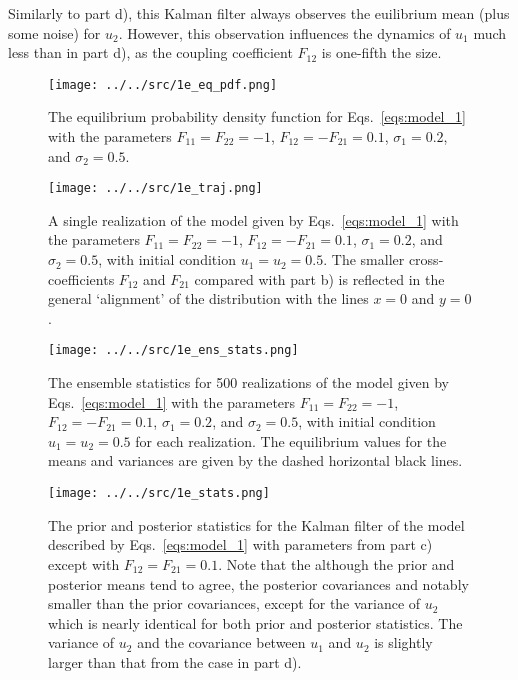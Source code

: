 \begin{enumerate}[a)]
	Similarly to part d), this Kalman filter always observes the euilibrium mean (plus some noise) for $u_2$. However, this observation influences the dynamics of $u_1$ much less than in part d), as the coupling coefficient $F_{12}$ is one-fifth the size.
	
	\begin{figure}[H]
		\centering
		\texttt{[image: ../../src/1e\_eq\_pdf.png]}
		\caption{The equilibrium probability density function for Eqs.~\ref{eqs:model_1} with the parameters $F_{11} = F_{22} = -1$, $F_{12} = -F_{21} = 0.1$, $\sigma_1 = 0.2$, and $\sigma_2 = 0.5$.}
		\label{fig:1e_eq_pdf}
	\end{figure}
	
	\begin{figure}[H]
		\centering
		\texttt{[image: ../../src/1e\_traj.png]}
		\caption{A single realization of the model given by Eqs.~\ref{eqs:model_1} with the parameters $F_{11} = F_{22} = -1$, $F_{12} = -F_{21} = 0.1$, $\sigma_1 = 0.2$, and $\sigma_2 = 0.5$, with initial condition $u_1 = u_2 = 0.5$. The smaller cross-coefficients $F_{12}$ and $F_{21}$ compared with part b) is reflected in the general `alignment' of the distribution with the lines $x = 0$ and $y = 0$.}
		\label{fig:1e_traj}
	\end{figure}
	
	\begin{figure}[H]
		\centering
		\texttt{[image: ../../src/1e\_ens\_stats.png]}
		\caption{The ensemble statistics for 500 realizations of the model given by Eqs.~\ref{eqs:model_1} with the parameters $F_{11} = F_{22} = -1$, $F_{12} = -F_{21} = 0.1$, $\sigma_1 = 0.2$, and $\sigma_2 = 0.5$, with initial condition $u_1 = u_2 = 0.5$ for each realization. The equilibrium values for the means and variances are given by the dashed horizontal black lines.}
		\label{fig:1e_ens_stats}
	\end{figure}
	
	\begin{figure}[H]
		\centering
		\texttt{[image: ../../src/1e\_stats.png]}
		\caption{The prior and posterior statistics for the Kalman filter of the model described by Eqs.~\ref{eqs:model_1} with parameters from part c) except with $F_{12} = F_{21} = 0.1$. Note that the although the prior and posterior means tend to agree, the posterior covariances and notably smaller than the prior covariances, except for the variance of $u_2$ which is nearly identical for both prior and posterior statistics. The variance of $u_2$ and the covariance between $u_1$ and $u_2$ is slightly larger than that from the case in part d).}
		\label{fig:1e_stats}
	\end{figure}
	

\end{enumerate}
